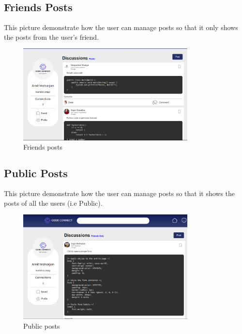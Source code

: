 \subsection{Friends Posts}
This picture demonstrate how the user can manage posts so that it only shows the posts from the user's friend.
\begin{figure}[H]
    \centering
    \includegraphics[width=0.8\textwidth]{Outcome-ss/friends-posts.png}
    \caption{Friends posts}
    \label{fig:Friends posts}
\end{figure}

\subsection{Public Posts}
This picture demonstrate how the user can manage posts so that it shows the posts of all the users (i.e Public).
\begin{figure}[H]
    \centering
    \includegraphics[width=0.8\textwidth]{Outcome-ss/public-posts.png}
    \caption{Public posts}
    \label{fig:Public posts}
\end{figure}

\newpage
